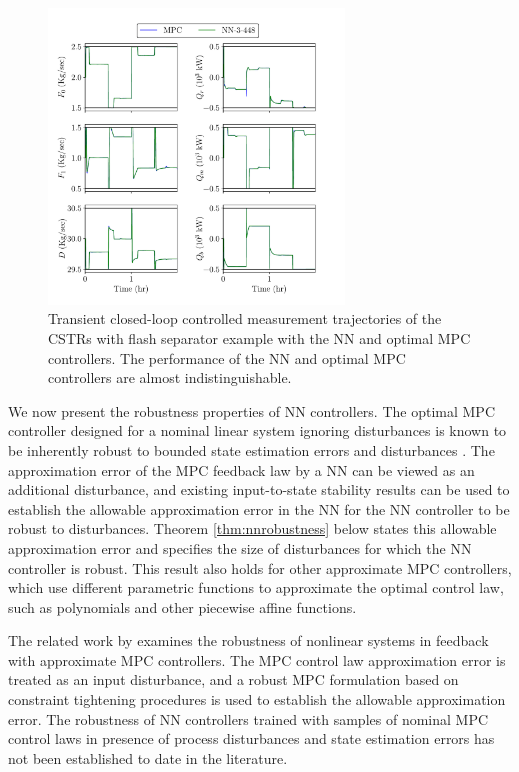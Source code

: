 \documentclass[preprint,5p, twocolumn, authoryear]{elsarticle}
\begin{document}
\begin{figure}[!h]
    \centering
	\includegraphics[page=2, width=0.7\textwidth,
		height=0.46\textheight]{cstrs_comparision_plots.pdf} \caption{Transient
		closed-loop controlled measurement trajectories of the CSTRs with flash
		separator example with the NN and optimal MPC controllers. The
		performance of the NN and optimal MPC controllers are almost
		indistinguishable.}
		\label{fig:cl_cstrs_outputs}
\end{figure}

We now present the robustness properties of NN controllers. The optimal MPC
controller designed for a nominal linear system ignoring disturbances is known
to be inherently robust to bounded state estimation errors and disturbances
\citep{heath:wills:2005, pannocchia:rawlings:wright:2011}. The approximation
error of the MPC feedback law by a NN can be viewed as an additional
disturbance, and existing input-to-state stability results
\citep{sontag:wang:1995} can be used to establish the allowable approximation
error in the NN for the NN controller to be robust to disturbances. Theorem
\ref{thm:nnrobustness} below states this allowable approximation error and
specifies the size of disturbances for which the NN controller is robust. This
result also holds for other approximate MPC controllers, which use different
parametric functions to approximate the optimal control law, such as polynomials
and other piecewise affine functions.

The related work by \cite{hertneck:kohler:trimpe:allgower:2018} examines the
robustness of nonlinear systems in feedback with approximate MPC controllers.
The MPC control law approximation error is treated as an input disturbance, and
a robust MPC formulation based on constraint tightening procedures is used to
establish the allowable approximation error. The robustness of NN controllers
trained with samples of nominal MPC control laws in presence of process
disturbances and state estimation errors has not been established to date in the
literature. 
\end{document}
